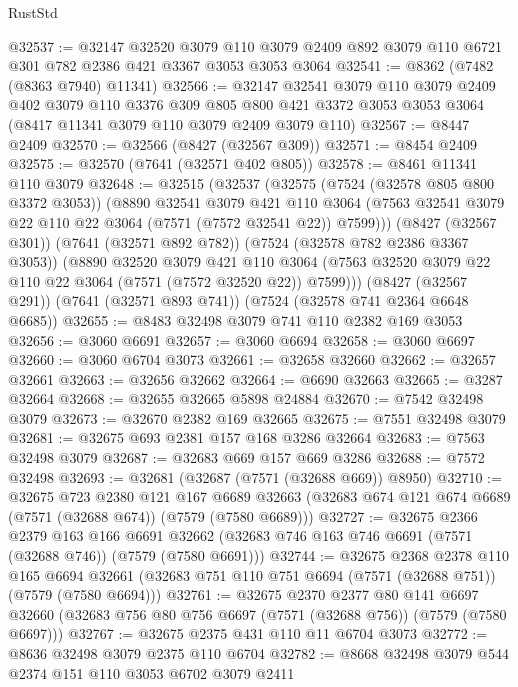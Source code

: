\begin{lexlean}{RustStd}
\begin{coremodule}
{\begin{coremodule}
{{{{{{{{{{{{{{{{{{{{{{{{{{{{{{{{@32537 := @32147
    @32520
    @3079
    @110
    @3079
    @2409
    @892
    @3079
    @110
    @6721
    @301
    @782
    @2386
    @421
    @3367
    @3053
    @3053
    @3064
@32541 := @8362 (@7482 (@8363 @7940) @11341)
@32566 := @32147
    @32541
    @3079
    @110
    @3079
    @2409
    @402
    @3079
    @110
    @3376
    @309
    @805
    @800
    @421
    @3372
    @3053
    @3053
    @3064
    (@8417 @11341 @3079 @110 @3079 @2409 @3079 @110)
@32567 := @8447 @2409
@32570 := @32566 (@8427 (@32567 @309))
@32571 := @8454 @2409
@32575 := @32570 (@7641 (@32571 @402 @805))
@32578 := @8461 @11341 @110 @3079
@32648 := @32515
    (@32537
      (@32575
        (@7524 (@32578 @805 @800 @3372 @3053))
        (@8890
          @32541
          @3079
          @421
          @110
          @3064
          (@7563 @32541 @3079 @22 @110 @22 @3064 (@7571 (@7572 @32541 @22)) @7599)))
      (@8427 (@32567 @301))
      (@7641 (@32571 @892 @782))
      (@7524 (@32578 @782 @2386 @3367 @3053))
      (@8890
        @32520
        @3079
        @421
        @110
        @3064
        (@7563 @32520 @3079 @22 @110 @22 @3064 (@7571 (@7572 @32520 @22)) @7599)))
    (@8427 (@32567 @291))
    (@7641 (@32571 @893 @741))
    (@7524 (@32578 @741 @2364 @6648 @6685))
@32655 := @8483 @32498 @3079 @741 @110 @2382 @169 @3053
@32656 := @3060 @6691
@32657 := @3060 @6694
@32658 := @3060 @6697
@32660 := @3060 @6704 @3073
@32661 := @32658 @32660
@32662 := @32657 @32661
@32663 := @32656 @32662
@32664 := @6690 @32663
@32665 := @3287 @32664
@32668 := @32655 @32665 @5898 @24884
@32670 := @7542 @32498 @3079
@32673 := @32670 @2382 @169 @32665
@32675 := @7551 @32498 @3079
@32681 := @32675 @693 @2381 @157 @168 @3286 @32664
@32683 := @7563 @32498 @3079
@32687 := @32683 @669 @157 @669 @3286
@32688 := @7572 @32498
@32693 := @32681 (@32687 (@7571 (@32688 @669)) @8950)
@32710 := @32675
    @723
    @2380
    @121
    @167
    @6689
    @32663
    (@32683 @674 @121 @674 @6689 (@7571 (@32688 @674)) (@7579 (@7580 @6689)))
@32727 := @32675
    @2366
    @2379
    @163
    @166
    @6691
    @32662
    (@32683 @746 @163 @746 @6691 (@7571 (@32688 @746)) (@7579 (@7580 @6691)))
@32744 := @32675
    @2368
    @2378
    @110
    @165
    @6694
    @32661
    (@32683 @751 @110 @751 @6694 (@7571 (@32688 @751)) (@7579 (@7580 @6694)))
@32761 := @32675
    @2370
    @2377
    @80
    @141
    @6697
    @32660
    (@32683 @756 @80 @756 @6697 (@7571 (@32688 @756)) (@7579 (@7580 @6697)))
@32767 := @32675 @2375 @431 @110 @11 @6704 @3073
@32772 := @8636 @32498 @3079 @2375 @110 @6704
@32782 := @8668 @32498 @3079 @544 @2374 @151 @110 @3053 @6702 @3079 @2411
}}}}}}}}}}}}}}}}}}}}}}}}}}}}}}}}
\end{coremodule}}
\end{coremodule}
\end{lexlean}
